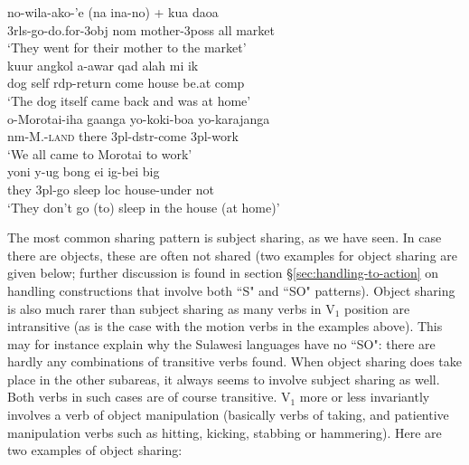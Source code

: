 \ea \label{tukangbesi003}
\gll no-wila-ako-'e (na ina-no) + kua daoa \\
3\acs{rls}-go-do.for-3\acs{obj} \acs{nom} mother-3\acs{poss} \acs{all} market \\
\glft `They went for their mother to the market' \\ 
\z
\xe
\ea \label{}
\gll kuur angkol a-awar qad alah mi ik \\
dog self \acs{rdp}-return come house be.at \acs{comp} \\
\glft `The dog itself came back and was at home' \\ 
\z
\xe
\ea \label{tobelo001}
\gll o-Morotai-iha gaanga yo-koki-boa yo-karajanga \\
\acs{nm}-M.-\textsc{land} there 3\acs{pl}-\acs{dstr}-come 3\acs{pl}-work \\
\glft `We all came to Morotai to work' \\ 
\z
\xe
\ea \label{}
\gll yoni y-ug bong ei ig-bei big \\
they 3\acs{pl}-go sleep \acs{loc} house-under not \\
\glft `They don't go (to) sleep in the house (at home)' \\ 
\z
\xe

The most common sharing pattern is subject sharing, as we have seen. In case there are objects, these are often not shared (two examples for object sharing are given below; further discussion is found in section §\ref{sec:handling-to-action} on handling constructions that involve both ``S" and ``SO" patterns). Object sharing is also much rarer than subject sharing as many verbs in V$_1$ position are intransitive (as is the case with the motion verbs in the examples above). This may for instance explain why the Sulawesi languages have no ``SO": there are hardly any combinations of transitive verbs found. When object sharing does take place in the other subareas, it always seems to involve subject sharing as well. Both verbs in such cases are of course transitive. V$_1$ more or less invariantly involves a verb of object manipulation (basically verbs of taking, and patientive manipulation verbs such as hitting, kicking, stabbing or hammering). Here are two examples of object sharing:

